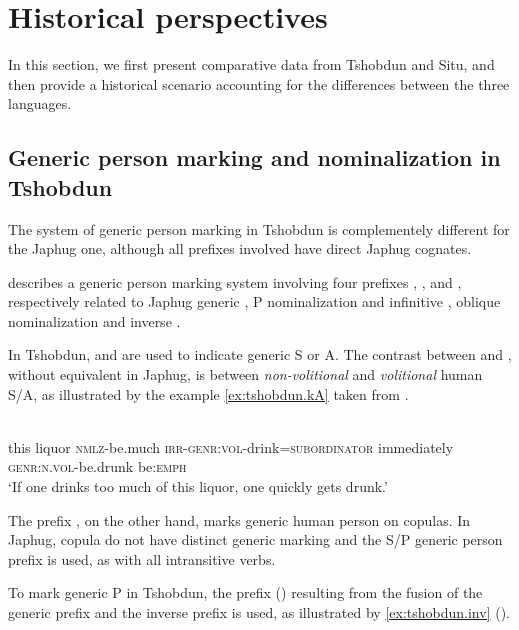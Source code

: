 \section{Historical perspectives}
In this section, we first present comparative data from Tshobdun and Situ, and then provide a historical scenario accounting for the differences between the three languages.

\subsection{Generic person marking and nominalization in Tshobdun} \label{tshobdun.genr}
The system of generic person marking in Tshobdun is complementely different for the Japhug one, although all prefixes involved have direct Japhug cognates.

\citet{sun14generic} describes a generic person marking system involving four prefixes , ,  and , respectively related to Japhug generic  , P nominalization and infinitive , oblique nominalization  and inverse . 

In Tshobdun,  and  are used to indicate generic S or A. The contrast between  and , without equivalent in Japhug, is between 	 \textit{non-volitional} and  \textit{volitional} human S/A, as illustrated by the   example \ref{ex:tshobdun.kA} taken from \citet[238]{sun14generic}.
 \begin{exe}
\ex \label{ex:tshobdun.kA}
\gll
{}  	  	  	  	  	  	   \\
 this liquor \textsc{nmlz}-be.much \textsc{irr-genr:vol}-drink=\textsc{subordinator}  immediately \textsc{genr:n.vol}-be.drunk be:\textsc{emph} \\
\glt  ‘If one drinks too much of this liquor, one quickly gets drunk.’ 
 \end{exe}
 
 The prefix , on the other hand, marks generic human person on copulas. In Japhug, copula do not have distinct generic marking and the S/P generic person prefix  is used, as with all intransitive verbs.
 
To mark generic P in Tshobdun, the prefix  () resulting from the  fusion  of  the generic prefix  and the inverse prefix  is used, as illustrated by \ref{ex:tshobdun.inv} (\citealt[240]{sun14generic}).

